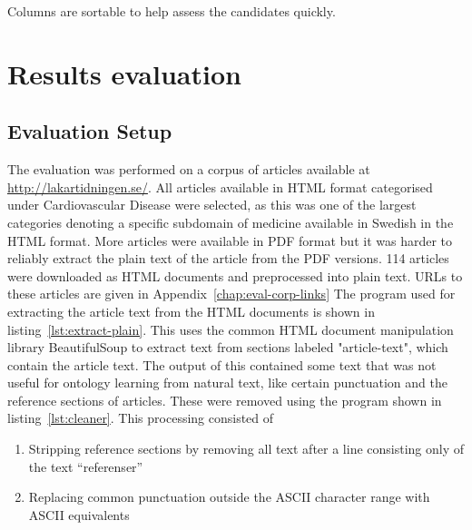 \documentclass[a4paper]{report}
\begin{document}
Columns are sortable to help assess the candidates quickly.

\chapter{Results evaluation}
\label{chap:eval}

\section{Evaluation Setup}

The evaluation was performed on a corpus of articles available at \url{http://lakartidningen.se/}.
All articles available in HTML format categorised under Cardiovascular Disease were selected, as this was one of the largest categories denoting a specific subdomain of medicine available in Swedish in the HTML format.
More articles were available in PDF format but it was harder to reliably extract the plain text of the article from the PDF versions.
114 articles were downloaded as HTML documents and preprocessed into plain text.
URLs to these articles are given in Appendix~\ref{chap:eval-corp-links}
The program used for extracting the article text from the HTML documents is shown in listing~\ref{lst:extract-plain}.
This uses the common HTML document manipulation library BeautifulSoup to extract text from sections labeled "article-text", which contain the article text.
The output of this contained some text that was not useful for ontology learning from natural text, like certain punctuation and the reference sections of articles.
These were removed using the program shown in listing~\ref{lst:cleaner}.
This processing consisted of
\begin{enumerate}
\item Stripping reference sections by removing all text after a line consisting only of the text ``referenser''
\item Replacing common punctuation outside the ASCII character range with ASCII equivalents
\end{enumerate}
\end{document}
